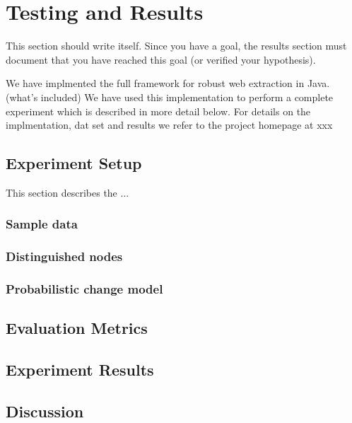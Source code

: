 \chapter{Testing and Results}

This section should write itself. Since you have a goal, the results section must document that you have reached this goal (or verified your hypothesis).

We have implmented the full framework for robust web extraction in Java. (what's included) We have used this implementation to perform a complete experiment which is described in more detail below. For details on the implmentation, dat set and results we refer to the project homepage at xxx

\section{Experiment Setup}

This section describes the ...

\subsection{Sample data}
\subsection{Distinguished nodes}
\subsection{Probabilistic change model}

\section{Evaluation Metrics}

\section{Experiment Results}

\section{Discussion}

